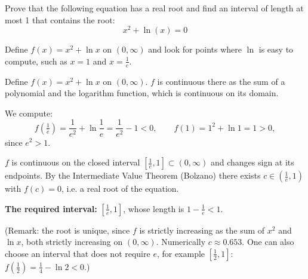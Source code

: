 
\begin{question}
Prove that the following equation has a real root and find an interval of length at most 1 that contains the root:
\[
x^2+\ln(x)=0
\]
\end{question}

\begin{hint}
Define $f(x)=x^2+\ln x$ on $(0,\infty)$ and look for points where $\ln$ is easy to compute, such as $x=1$ and $x=\frac1e$.
\end{hint}

\begin{solution}
Define $f(x)=x^2+\ln x$ on $(0,\infty)$. $f$ is continuous there as the sum of a polynomial and the logarithm function, which is continuous on its domain.

We compute:
\[
f\!\left(\tfrac1e\right)=\frac1{e^2}+\ln\frac1e=\frac{1}{e^2}-1<0,\qquad f(1)=1^2+\ln1=1>0 ,
\]
since $e^2>1$.

$f$ is continuous on the closed interval $\left[\frac1e,1\right]\subset(0,\infty)$ and changes sign at its endpoints. By the Intermediate Value Theorem (Bolzano) there exists $c\in\left(\frac1e,1\right)$ with $f(c)=0$, i.e. a real root of the equation.

\textbf{The required interval:} $\left[\frac1e,1\right]$, whose length is $1-\frac1e<1$.

(Remark: the root is unique, since $f$ is strictly increasing as the sum of $x^2$ and $\ln x$, both strictly increasing on $(0,\infty)$. Numerically $c\approx0.653$. One can also choose an interval that does not require $e$, for example $\left[\frac12,1\right]$: $f(\frac12)=\frac14-\ln2<0$.)
\end{solution}
